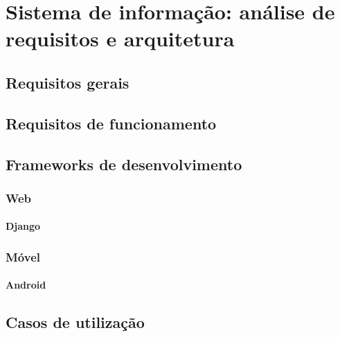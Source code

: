 \chapter{Sistema de informação: análise de requisitos e arquitetura}





\section{Requisitos gerais}



\section{Requisitos de funcionamento}



\section{Frameworks de desenvolvimento}


\subsection{Web}

\subsubsection{Django}



\subsection{Móvel}

\subsubsection{Android }



\section{Casos de utilização}


